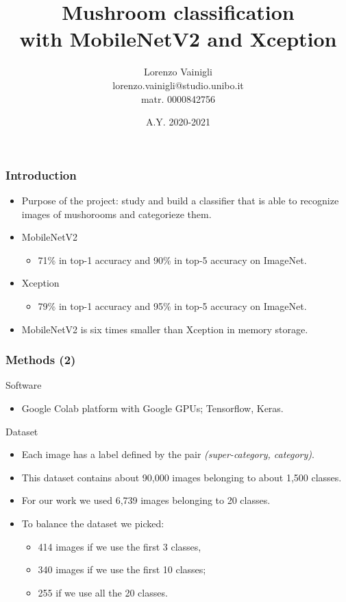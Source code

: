 \documentclass{beamer}
\title{Mushroom classification\\
with MobileNetV2 and Xception}
\author{Lorenzo Vainigli\\
lorenzo.vainigli@studio.unibo.it\\
matr. 0000842756}
\institute{Course of Machine Learning\\
Laurea Magistrale in Informatica\\
University of Bologna}
\date{A.Y. 2020-2021}
\begin{document}
\frame{\titlepage}

\begin{frame}
\frametitle{Introduction}
\begin{itemize}
\setlength\itemsep{1em}
\item Purpose of the project: study and build a classifier that is
able to recognize images of mushorooms and categorieze them.
\item MobileNetV2
\begin{itemize}
\item 71\% in top-1 accuracy and 90\% in top-5 accuracy on ImageNet. 
\end{itemize}
\item Xception
\begin{itemize}
\item 79\% in top-1 accuracy and 95\% in top-5 accuracy on ImageNet. 
\end{itemize}
\item MobileNetV2 is six times smaller than Xception in memory
storage.
\end{itemize}
\end{frame}

\begin{frame}
\frametitle{Methods (2)}
\begin{block}{Software}
\begin{itemize}
\setlength\itemsep{1em}
\item Google Colab platform with Google GPUs; Tensorflow, Keras.
\end{itemize}
\end{block}
\begin{block}{Dataset}
\begin{itemize}
\setlength\itemsep{0.5em}
\item Each image has a label defined by the pair \textit{(super-category, category)}.
\item This dataset contains about 90,000 images belonging to about 1,500 classes.
\item For our work we used 6,739 images belonging to 20 classes.
\item To balance the dataset we picked:
\begin{itemize}
\item 414 images if we use the first 3 classes, 
\item 340 images if we use the first 10 classes;
\item 255 if we use all the 20 classes.
\end{itemize}
\end{itemize}
\end{block}
\end{frame}
\end{document}
